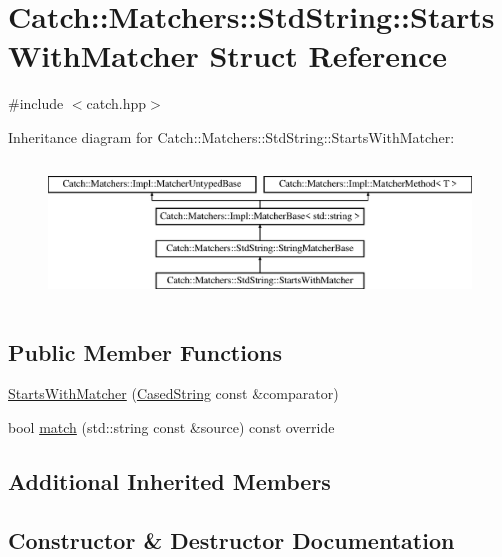 \hypertarget{struct_catch_1_1_matchers_1_1_std_string_1_1_starts_with_matcher}{}\section{Catch\+:\+:Matchers\+:\+:Std\+String\+:\+:Starts\+With\+Matcher Struct Reference}
\label{struct_catch_1_1_matchers_1_1_std_string_1_1_starts_with_matcher}


{\ttfamily \#include $<$catch.\+hpp$>$}

Inheritance diagram for Catch\+:\+:Matchers\+:\+:Std\+String\+:\+:Starts\+With\+Matcher\+:\begin{figure}[H]
\begin{center}
\leavevmode
\includegraphics[height=3.758389cm]{struct_catch_1_1_matchers_1_1_std_string_1_1_starts_with_matcher}
\end{center}
\end{figure}
\subsection*{Public Member Functions}
\begin{DoxyCompactItemize}
\item 
\mbox{\hyperlink{struct_catch_1_1_matchers_1_1_std_string_1_1_starts_with_matcher_a7b86f258bdbd131a6e7bcd94a8977325}{Starts\+With\+Matcher}} (\mbox{\hyperlink{struct_catch_1_1_matchers_1_1_std_string_1_1_cased_string}{Cased\+String}} const \&comparator)
\item 
bool \mbox{\hyperlink{struct_catch_1_1_matchers_1_1_std_string_1_1_starts_with_matcher_a7da4747aed0c48989d8be59a89e2b7fb}{match}} (std\+::string const \&source) const override
\end{DoxyCompactItemize}
\subsection*{Additional Inherited Members}


\subsection{Constructor \& Destructor Documentation}
\mbox{\label{struct_catch_1_1_matchers_1_1_std_string_1_1_starts_with_matcher_a7b86f258bdbd131a6e7bcd94a8977325}} 
